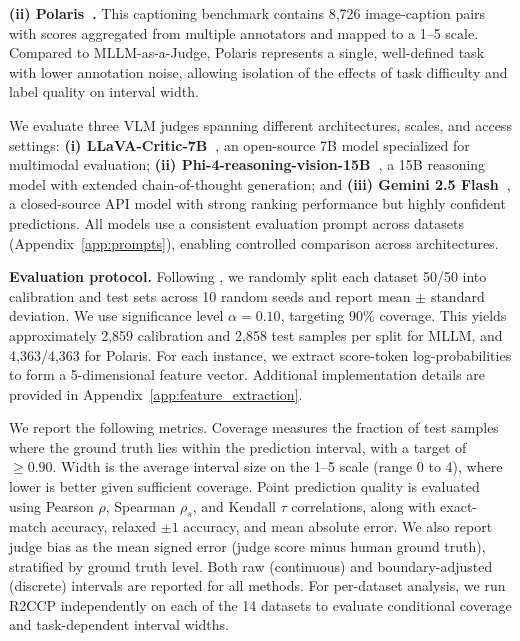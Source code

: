 \documentclass{article}
\begin{document}
\textbf{(ii) Polaris~\citep{sun2024polaris}.}
This captioning benchmark contains 8,726 image-caption pairs with scores aggregated from multiple annotators and mapped to a 1--5 scale. Compared to MLLM-as-a-Judge, Polaris represents a single, well-defined task with lower annotation noise, allowing isolation of the effects of task difficulty and label quality on interval width.

We evaluate three VLM judges spanning different architectures, scales, and access settings: \textbf{(i) LLaVA-Critic-7B~\citep{xiong2024llavacritic}}, an open-source 7B model specialized for multimodal evaluation; \textbf{(ii) Phi-4-reasoning-vision-15B~\citep{abdin2025phi4reasoning}}, a 15B reasoning model with extended chain-of-thought generation; and \textbf{(iii) Gemini 2.5 Flash~\citep{google2025gemini25}}, a closed-source API model with strong ranking performance but highly confident predictions. All models use a consistent evaluation prompt across datasets (Appendix~\ref{app:prompts}), enabling controlled comparison across architectures.

\textbf{Evaluation protocol.}
Following \citet{sheng2025analyzing}, we randomly split each dataset 50/50 into calibration and test sets across 10 random seeds and report mean $\pm$ standard deviation. We use significance level $\alpha = 0.10$, targeting 90\% coverage. This yields approximately 2,859 calibration and 2,858 test samples per split for MLLM, and 4,363/4,363 for Polaris. For each instance, we extract score-token log-probabilities to form a 5-dimensional feature vector. Additional implementation details are provided in Appendix~\ref{app:feature_extraction}.

We report the following metrics. Coverage measures the fraction of test samples where the ground truth lies within the prediction interval, with a target of $\geq 0.90$. Width is the average interval size on the 1--5 scale (range 0 to 4), where lower is better given sufficient coverage. Point prediction quality is evaluated using Pearson $\rho$, Spearman $\rho_s$, and Kendall $\tau$ correlations, along with exact-match accuracy, relaxed $\pm 1$ accuracy, and mean absolute error. We also report judge bias as the mean signed error (judge score minus human ground truth), stratified by ground truth level. Both raw (continuous) and boundary-adjusted (discrete) intervals are reported for all methods. For per-dataset analysis, we run R2CCP independently on each of the 14 datasets to evaluate conditional coverage and task-dependent interval widths.
\end{document}
